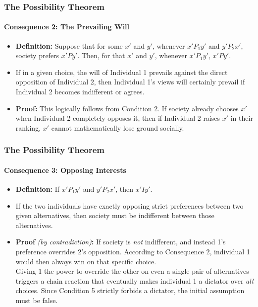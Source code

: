 \documentclass{beamer}
\begin{document}
\begin{frame}
    \frametitle{The Possibility Theorem}
    \framesubtitle{Consequence 2: The Prevailing Will}

    \begin{itemize}
        \item \textbf{Definition:} Suppose that for some $x'$ and $y'$, whenever $x'P_1y'$ and $y'P_2x'$, society prefers $x'Py'$. Then, for that $x'$ and $y'$, whenever $x'P_1y'$, $x'Py'$.
        \item[$\Rightarrow$] If in a given choice, the will of Individual 1 prevails against the direct opposition of Individual 2, then Individual 1's views will certainly prevail if Individual 2 becomes indifferent or agrees.
        \vspace{0.25 cm}
        \item \textbf{Proof:} This logically follows from Condition 2. If society already chooses $x'$ when Individual 2 completely opposes it, then if Individual 2 raises $x'$ in their ranking, $x'$ cannot mathematically lose ground socially.
    \end{itemize}
\end{frame}

\begin{frame}
    \frametitle{The Possibility Theorem}
    \framesubtitle{Consequence 3: Opposing Interests}

    \begin{itemize}
        \item \textbf{Definition:} If $x'P_1y'$ and $y'P_2x'$, then $x'Iy'$.
        \item[$\Rightarrow$] If the two individuals have exactly opposing strict preferences between two given alternatives, then society must be indifferent between those alternatives.
        \vspace{0.25 cm}
        \item \textbf{Proof} \textit{(by contradiction)}\textbf{:} If society is \textit{not} indifferent, and instead 1's preference overrides 2's opposition. According to Consequence 2, individual 1 would then always win on that specific choice. \\
        \vspace{0.25 cm}
        Giving  1 the power to override the other on even a single pair of alternatives triggers a chain reaction that eventually makes individual 1 a dictator over \textit{all} choices. Since Condition 5 strictly forbids a dictator, the initial assumption must be false.
    \end{itemize}

    
\end{frame}
\end{document}
